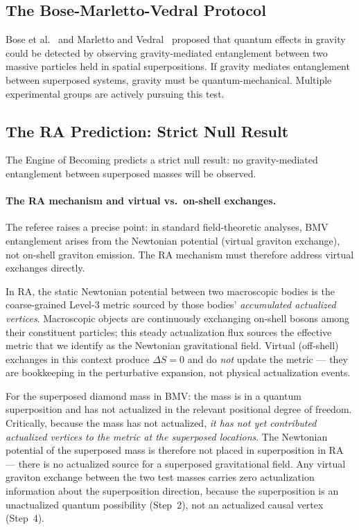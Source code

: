\documentclass[11pt,a4paper]{article}
\theoremstyle{plain}
\theoremstyle{definition}
\theoremstyle{remark}
\begin{document}
\subsection{The Bose-Marletto-Vedral Protocol}

Bose et al.~\citep{Bose2017} and Marletto and Vedral~\citep{Marletto2017}
proposed that quantum effects in gravity could be detected by observing
gravity-mediated entanglement between two massive particles held in spatial
superpositions. If gravity mediates entanglement between superposed systems,
gravity must be quantum-mechanical. Multiple experimental groups are actively
pursuing this test.

\subsection{The RA Prediction: Strict Null Result}

The Engine of Becoming predicts a strict null result: no gravity-mediated
entanglement between superposed masses will be observed.

\paragraph{The RA mechanism and virtual vs.\ on-shell exchanges.}
The referee raises a precise point: in standard field-theoretic analyses,
BMV entanglement arises from the Newtonian potential (virtual graviton
exchange), not on-shell graviton emission. The RA mechanism must therefore
address virtual exchanges directly.

In RA, the static Newtonian potential between two macroscopic bodies is
the coarse-grained Level-3 metric sourced by those bodies' \emph{accumulated
actualized vertices}. Macroscopic objects are continuously exchanging on-shell
bosons among their constituent particles; this steady actualization flux
sources the effective metric that we identify as the Newtonian gravitational
field. Virtual (off-shell) exchanges in this context produce $\Delta S = 0$
and do \emph{not} update the metric --- they are bookkeeping in the
perturbative expansion, not physical actualization events.

For the superposed diamond mass in BMV: the mass is in a quantum superposition
and has not actualized in the relevant positional degree of freedom. Critically,
because the mass has not actualized, \emph{it has not yet contributed
actualized vertices to the metric at the superposed locations}. The Newtonian
potential of the superposed mass is therefore not placed in superposition in
RA --- there is no actualized source for a superposed gravitational field.
Any virtual graviton exchange between the two test masses carries zero
actualization information about the superposition direction, because the
superposition is an unactualized quantum possibility (Step~2), not an
actualized causal vertex (Step~4).
\end{document}
